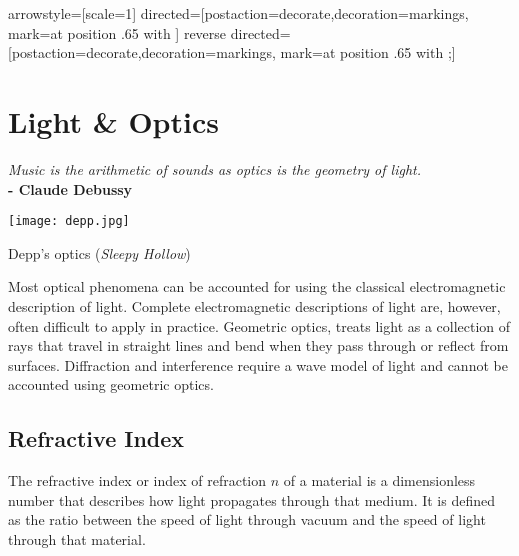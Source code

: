 \tikzstyle arrowstyle=[scale=1]
\tikzstyle directed=[postaction={decorate,decoration={markings,
    mark=at position .65 with {}}}]
\tikzstyle reverse directed=[postaction={decorate,decoration={markings,
    mark=at position .65 with {;}}}]

\chapter{Light \& Optics}

\textit{Music is the arithmetic of sounds as optics is the geometry of light.}\\
\noindent\textbf{-   Claude Debussy}

\vspace{0.5cm}


\begin{marginfigure}%
  \texttt{[image: depp.jpg]}
  \caption{Depp's optics (\textit{Sleepy Hollow})}
  \label{fig:marginfig}
\end{marginfigure}

Most optical phenomena can be accounted for using the classical electromagnetic description of light. Complete electromagnetic descriptions of light are, however, often difficult to apply in practice. Geometric optics, treats light as a collection of rays that travel in straight lines and bend when they pass through or reflect from surfaces. Diffraction and interference require a wave model of light and cannot be accounted using geometric optics.


\section{Refractive Index}
 The refractive index or index of refraction $n$ of a material is a dimensionless number that describes how light propagates through that medium. It is defined as the ratio between the speed of light through vacuum and the speed of light through that material.
 
